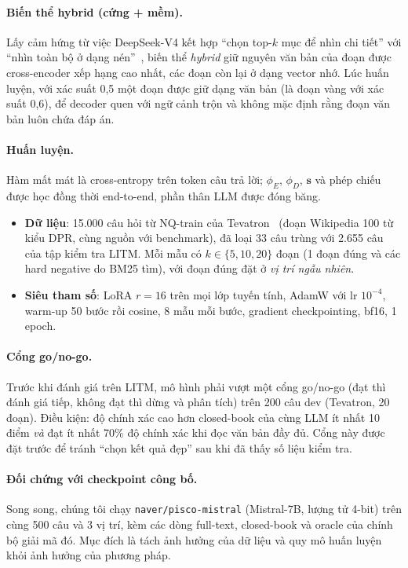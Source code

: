 \paragraph{Biến thể hybrid (cứng + mềm).} Lấy cảm hứng từ việc DeepSeek-V4 kết hợp ``chọn top-$k$ mục
để nhìn chi tiết'' với ``nhìn toàn bộ ở dạng nén''~\cite{deepseek2026v4}, biến thể \emph{hybrid} giữ
nguyên văn bản của đoạn được cross-encoder xếp hạng cao nhất, các đoạn còn lại ở dạng vector nhớ. Lúc
huấn luyện, với xác suất 0,5 một đoạn được giữ dạng văn bản (là đoạn vàng với xác suất 0,6), để
decoder quen với ngữ cảnh trộn và không mặc định rằng đoạn văn bản luôn chứa đáp án.

\paragraph{Huấn luyện.} Hàm mất mát là cross-entropy trên token câu trả lời; $\phi_E$, $\phi_D$,
$\mathbf{s}$ và phép chiếu được học đồng thời end-to-end, phần thân LLM được đóng băng.
\begin{itemize}
  \item \textbf{Dữ liệu}: 15.000 câu hỏi từ NQ-train của Tevatron~\cite{tevatron} (đoạn Wikipedia
  100 từ kiểu DPR, cùng nguồn với benchmark), đã loại 33 câu trùng với 2.655 câu của tập kiểm tra
  LITM. Mỗi mẫu có $k\in\{5,10,20\}$ đoạn (1 đoạn đúng và các hard negative do BM25 tìm), với đoạn
  đúng đặt ở \emph{vị trí ngẫu nhiên}.
  \item \textbf{Siêu tham số}: LoRA $r=16$ trên mọi lớp tuyến tính, AdamW với lr $10^{-4}$, warm-up
  50 bước rồi cosine, 8 mẫu mỗi bước, gradient checkpointing, bf16, 1 epoch.
\end{itemize}

\paragraph{Cổng go/no-go.} Trước khi đánh giá trên LITM, mô hình phải vượt một cổng go/no-go (đạt thì đánh giá tiếp, không đạt thì dừng và phân tích) trên 200 câu dev
(Tevatron, 20 đoạn). Điều kiện: độ chính xác cao hơn closed-book của cùng LLM ít nhất 10 điểm
\emph{và} đạt ít nhất 70\% độ chính xác khi đọc văn bản đầy đủ. Cổng này được đặt trước để tránh
``chọn kết quả đẹp'' sau khi đã thấy số liệu kiểm tra.

\paragraph{Đối chứng với checkpoint công bố.} Song song, chúng tôi chạy \texttt{naver/pisco-mistral}
(Mistral-7B, lượng tử 4-bit) trên cùng 500 câu và 3 vị trí, kèm các dòng full-text, closed-book và
oracle của chính bộ giải mã đó. Mục đích là tách ảnh hưởng của dữ liệu và quy mô huấn luyện khỏi ảnh
hưởng của phương pháp.

